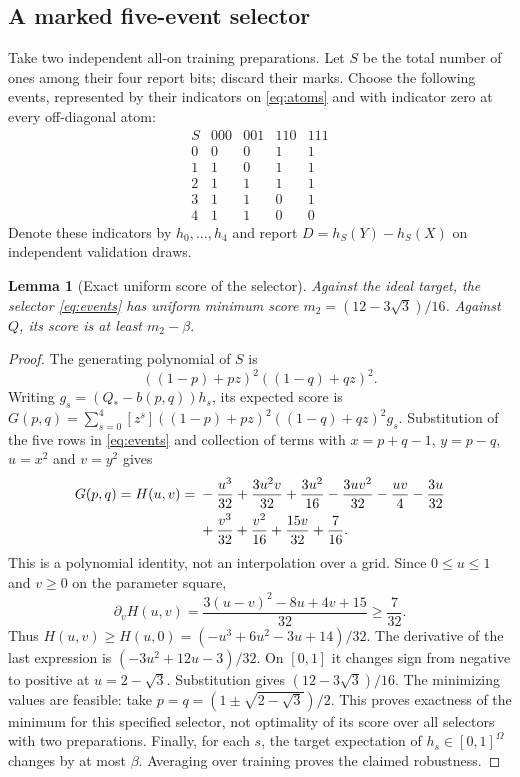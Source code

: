 \documentclass[11pt]{amsart}
\newtheorem{lemma}[theorem]{Lemma}
\theoremstyle{definition}\newtheorem{definition}[theorem]{Definition}
\theoremstyle{remark}\newtheorem{remark}[theorem]{Remark}
\newcommand{\1}{\mathbf 1}
\newcommand{\Qstar}{Q_*}
\begin{document}
\subsection{A marked five-event selector}
Take two independent all-on training preparations. Let $S$ be the total
number of ones among their four report bits; discard their marks. Choose
the following events, represented by their indicators on
\eqref{eq:atoms} and with indicator zero at every off-diagonal atom:
\begin{equation}\label{eq:events}
\begin{array}{c|rrrr}
 S&000&001&110&111\\\hline
0&0&0&1&1\\
1&1&0&1&1\\
2&1&1&1&1\\
3&1&1&0&1\\
4&1&1&0&0
\end{array}
\end{equation}
Denote these indicators by $h_0,\ldots,h_4$ and report
$D=h_S(Y)-h_S(X)$ on independent validation draws.

\begin{lemma}[Exact uniform score of the selector]\label{lem:two}
Against the ideal target, the selector \eqref{eq:events} has uniform
minimum score $m_2=(12-3\sqrt3)/16$. Against $Q$, its score is at least
$m_2-\beta$.
\end{lemma}
\begin{proof}
The generating polynomial of $S$ is
\[
 ((1-p)+pz)^2((1-q)+qz)^2.
\]
Writing $g_s=(\Qstar-b(p,q))h_s$, its expected score is
$G(p,q)=\sum_{s=0}^4[z^s]((1-p)+pz)^2((1-q)+qz)^2 g_s$.
Substitution of the five rows in \eqref{eq:events} and collection of terms
with $x=p+q-1$, $y=p-q$, $u=x^2$ and $v=y^2$ gives
\begin{align}
 G(p,q)=H(u,v)
  ={}&-\frac{u^3}{32}+\frac{3u^2v}{32}+\frac{3u^2}{16}
       -\frac{3uv^2}{32}-\frac{uv}{4}-\frac{3u}{32}\notag\\
     &+\frac{v^3}{32}+\frac{v^2}{16}+\frac{15v}{32}+\frac7{16}.
                                                        \label{eq:poly}
\end{align}
This is a polynomial identity, not an interpolation over a grid. Since
$0\le u\le1$ and $v\ge0$ on the parameter square,
\[
 \partial_vH(u,v)=\frac{3(u-v)^2-8u+4v+15}{32}\ge\frac7{32}.
\]
Thus $H(u,v)\ge H(u,0)=(-u^3+6u^2-3u+14)/32$.
The derivative of the last expression is
$(-3u^2+12u-3)/32$. On $[0,1]$ it changes sign from negative to positive
at $u=2-\sqrt3$. Substitution gives $(12-3\sqrt3)/16$.
The minimizing values are feasible: take
$p=q=(1\pm\sqrt{2-\sqrt3})/2$. This proves exactness of the minimum
for this specified selector, not optimality of its score over all
selectors with two preparations. Finally, for each $s$, the target
expectation of $h_s\in[0,1]^\Omega$ changes by at most $\beta$.
Averaging over training proves the claimed robustness.
\end{proof}
\end{document}
